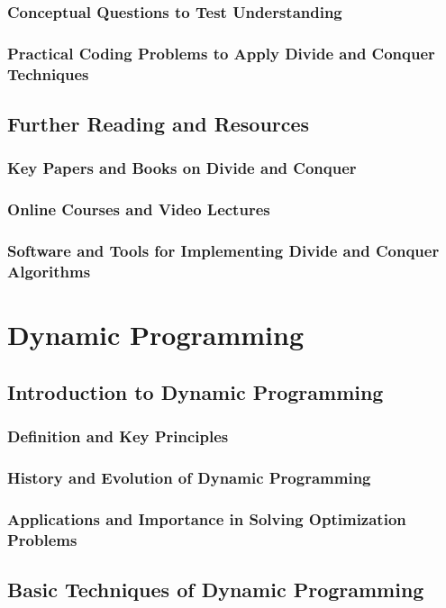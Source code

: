\documentclass[12pt]{book} %
\begin{document}
\subsection{Conceptual Questions to Test Understanding}
\subsection{Practical Coding Problems to Apply Divide and Conquer Techniques}

\section{Further Reading and Resources}
\subsection{Key Papers and Books on Divide and Conquer}
\subsection{Online Courses and Video Lectures}
\subsection{Software and Tools for Implementing Divide and Conquer Algorithms}


\chapter{Dynamic Programming}

\section{Introduction to Dynamic Programming}
\subsection{Definition and Key Principles}
\subsection{History and Evolution of Dynamic Programming}
\subsection{Applications and Importance in Solving Optimization Problems}

\section{Basic Techniques of Dynamic Programming}
\end{document}
